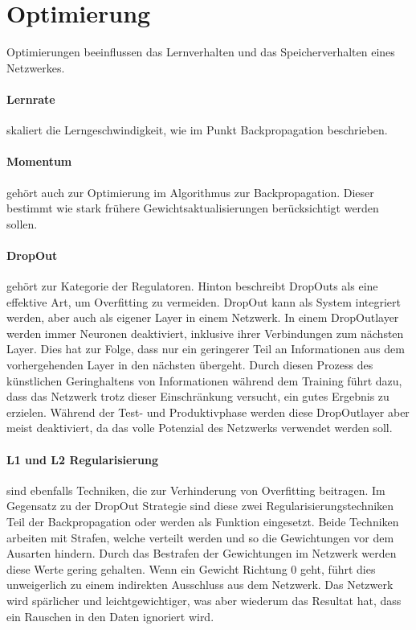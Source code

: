 \section{Optimierung}

Optimierungen beeinflussen das Lernverhalten und das Speicherverhalten eines Netzwerkes.

\paragraph{Lernrate} skaliert die Lerngeschwindigkeit, wie im Punkt Backpropagation beschrieben.

\paragraph{Momentum} gehört auch zur Optimierung im Algorithmus zur Backpropagation.
Dieser bestimmt wie stark frühere Gewichtsaktualisierungen berücksichtigt werden sollen. 

\paragraph{DropOut} gehört zur Kategorie der Regulatoren. 
Hinton \cite{krizhevsky2012imagenet} beschreibt DropOuts als eine effektive Art, um Overfitting zu vermeiden.
DropOut kann als System integriert werden, aber auch als eigener Layer in einem Netzwerk.
In einem DropOutlayer werden immer Neuronen deaktiviert, inklusive ihrer Verbindungen zum nächsten Layer.
Dies hat zur Folge, dass nur ein geringerer Teil an Informationen aus dem vorhergehenden Layer in den nächsten übergeht. 
Durch diesen Prozess des künstlichen Geringhaltens von Informationen während dem Training führt dazu, dass das Netzwerk trotz dieser Einschränkung versucht, ein gutes Ergebnis zu erzielen. 
Während der Test- und Produktivphase werden diese DropOutlayer aber meist deaktiviert, da das volle Potenzial des Netzwerks verwendet werden soll.

\paragraph{L1 und L2 Regularisierung} sind ebenfalls Techniken, die zur Verhinderung von Overfitting beitragen.
Im Gegensatz zu der DropOut Strategie sind diese zwei Regularisierungstechniken Teil der Backpropagation oder werden als Funktion eingesetzt.
Beide Techniken arbeiten mit Strafen, welche verteilt werden und so die Gewichtungen vor dem Ausarten hindern. 
Durch das Bestrafen der Gewichtungen im Netzwerk werden diese Werte gering gehalten. %
Wenn ein Gewicht Richtung $0$ geht, führt dies unweigerlich zu einem indirekten Ausschluss aus dem Netzwerk.
Das Netzwerk wird spärlicher und leichtgewichtiger, was aber wiederum das Resultat hat, dass ein Rauschen in den Daten ignoriert wird.

